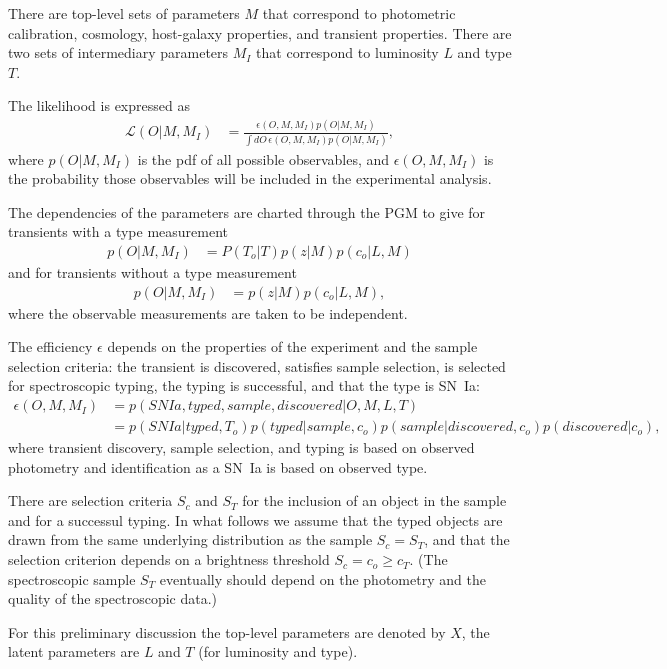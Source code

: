 \documentclass[preprint,3p]{elsarticle}
\begin{document}
There are top-level  sets of parameters $M$ that correspond to photometric calibration, cosmology,
host-galaxy properties, and transient properties.
There are two sets of intermediary parameters $M_I$ that correspond to luminosity $L$ and type $T$.

The likelihood is expressed as
\begin{align*}
\mathcal{L}(O| M, M_I) & = \frac{\epsilon(O, M, M_I) p(O|M, M_I)}{\int dO\, \epsilon(O, M, M_I) p(O|M, M_I)},
\end{align*}
where $p(O|M, M_I)$ is the pdf of all possible observables, and $\epsilon(O, M, M_I)$
is the probability those observables will be included in the experimental analysis.

The dependencies of the parameters are charted through the PGM to give for transients with a type measurement
\begin{align*}
p(O| M, M_I) & = P(T_o | T) p(z | M) p(c_o | L, M)
\end{align*}
and for transients without a type measurement
\begin{align*}
p(O| M, M_I) & = p(z | M) p(c_o | L, M),
\end{align*}
where the observable measurements are taken to be independent.

The efficiency $\epsilon$ depends on the properties of the experiment and the sample selection criteria:
the transient is discovered, satisfies sample selection, is selected for spectroscopic typing, the typing
is successful, and that the type is SN~Ia:
\begin{align*}
\epsilon(O, M, M_I) & = p(SNIa, typed, sample, discovered |O, M, L, T)\\
& = p(SNIa|  typed, T_o)p(typed | sample, c_o)p(sample| discovered, c_o)p(discovered |c_o),
\end{align*}
where transient discovery, sample selection, and typing is based on observed photometry and
identification as a SN~Ia is based on observed type.

There are selection criteria $S_c$ and $S_T$ for the inclusion of an object in the
sample and for a successul typing.
In what follows we assume that the typed objects are drawn from the same underlying
distribution as the sample $S_c=S_T$, and that the selection criterion depends on a  brightness
threshold $S_c = c_o \ge c_T$.  (The spectroscopic sample $S_T$ 
eventually should depend on the
photometry and the quality of the spectroscopic data.)

For this preliminary discussion the top-level parameters are denoted by $X$,
the latent parameters are $L$ and $T$ (for luminosity and type).  
\end{document}
